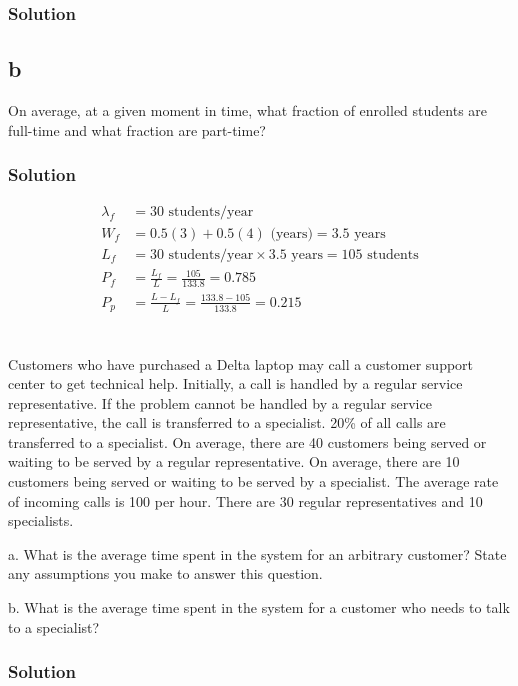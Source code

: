 \documentclass{amsart}
\begin{document}
\subsubsection*{Solution}

\subsection*{b}
On average, at a given moment in time, what fraction of enrolled students are
full-time and what fraction are part-time?

\subsubsection*{Solution}
\begin{align}
\lambda_f &= 30\text{ students/year}\\
  W_f &=0.5(3) + 0.5(4)\text{ (years)}
     = 3.5 \text{ years} \\
  L_f &= 30\text{ students/year} \times 3.5 \text{ years} = 105\text{ students}\\
  P_f &= \frac{L_f}{L}=\frac{105}{133.8} = 0.785\\
  P_p &= \frac{L-L_f}{L}=\frac{133.8-105}{133.8} = 0.215
\end{align}

\section{} %
Customers who have purchased a Delta laptop may call a customer support center to get
technical help. Initially, a call is handled by a regular service representative. If the
problem cannot be handled by a regular service representative, the call is transferred to a
specialist. 20\% of all calls are transferred to a specialist. On average, there are 40
customers being served or waiting to be served by a regular representative. On average,
there are 10 customers being served or waiting to be served by a specialist. The average
rate of incoming calls is 100 per hour. There are 30 regular representatives and 10
specialists.

a. What is the average time spent in the system for an arbitrary customer? State any
assumptions you make to answer this question.

b. What is the average time spent in the system for a customer who needs to talk to
a specialist?
\subsubsection*{Solution}
\end{document}
